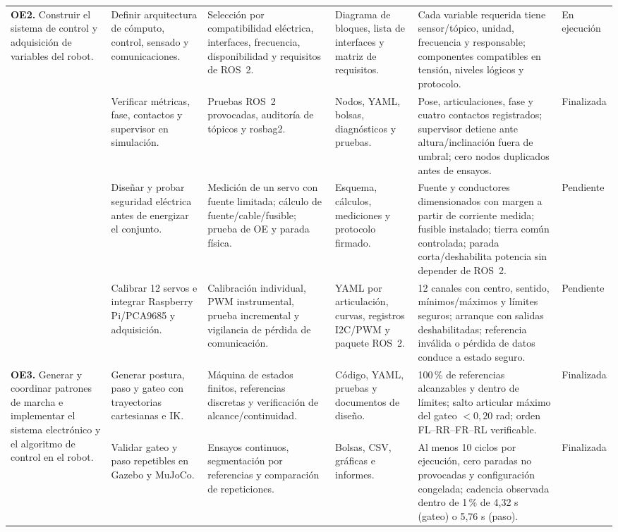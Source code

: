 \documentclass[10pt,letterpaper]{article}
\newcommand{\finalizada}{\cellcolor{verde}Finalizada}
\newcommand{\ejecucion}{\cellcolor{amarillo}En ejecución}
\newcommand{\pendiente}{\cellcolor{gris}Pendiente}
\begin{document}
\begin{landscape}
\begin{longtable}{p{3.6cm}p{3.7cm}p{4.2cm}p{3.6cm}p{5.0cm}p{1.6cm}}
\hline
\multirow{4}{3.6cm}{\textbf{OE2.} Construir el sistema de control y adquisición de variables del robot.}
& Definir arquitectura de cómputo, control, sensado y comunicaciones. & Selección por compatibilidad eléctrica, interfaces, frecuencia, disponibilidad y requisitos de ROS~2. & Diagrama de bloques, lista de interfaces y matriz de requisitos. & Cada variable requerida tiene sensor/tópico, unidad, frecuencia y responsable; componentes compatibles en tensión, niveles lógicos y protocolo. & \ejecucion\\
& Verificar métricas, fase, contactos y supervisor en simulación. & Pruebas ROS~2 provocadas, auditoría de tópicos y rosbag2. & Nodos, YAML, bolsas, diagnósticos y pruebas. & Pose, articulaciones, fase y cuatro contactos registrados; supervisor detiene ante altura/inclinación fuera de umbral; cero nodos duplicados antes de ensayos. & \finalizada\\
& Diseñar y probar seguridad eléctrica antes de energizar el conjunto. & Medición de un servo con fuente limitada; cálculo de fuente/cable/fusible; prueba de OE y parada física. & Esquema, cálculos, mediciones y protocolo firmado. & Fuente y conductores dimensionados con margen a partir de corriente medida; fusible instalado; tierra común controlada; parada corta/deshabilita potencia sin depender de ROS~2. & \pendiente\\
& Calibrar 12 servos e integrar Raspberry Pi/PCA9685 y adquisición. & Calibración individual, PWM instrumental, prueba incremental y vigilancia de pérdida de comunicación. & YAML por articulación, curvas, registros I2C/PWM y paquete ROS~2. & 12 canales con centro, sentido, mínimos/máximos y límites seguros; arranque con salidas deshabilitadas; referencia inválida o pérdida de datos conduce a estado seguro. & \pendiente\\[2pt]
\hline
\multirow{5}{3.6cm}{\textbf{OE3.} Generar y coordinar patrones de marcha e implementar el sistema electrónico y el algoritmo de control en el robot.}
& Generar postura, paso y gateo con trayectorias cartesianas e IK. & Máquina de estados finitos, referencias discretas y verificación de alcance/continuidad. & Código, YAML, pruebas y documentos de diseño. & 100\,\% de referencias alcanzables y dentro de límites; salto articular máximo del gateo $<0,20$ rad; orden FL--RR--FR--RL verificable. & \finalizada\\
& Validar gateo y paso repetibles en Gazebo y MuJoCo. & Ensayos continuos, segmentación por referencias y comparación de repeticiones. & Bolsas, CSV, gráficas e informes. & Al menos 10 ciclos por ejecución, cero paradas no provocadas y configuración congelada; cadencia observada dentro de 1\,\% de 4,32 s (gateo) o 5,76 s (paso). & \finalizada\\

\end{longtable}
\end{landscape}
\end{document}

